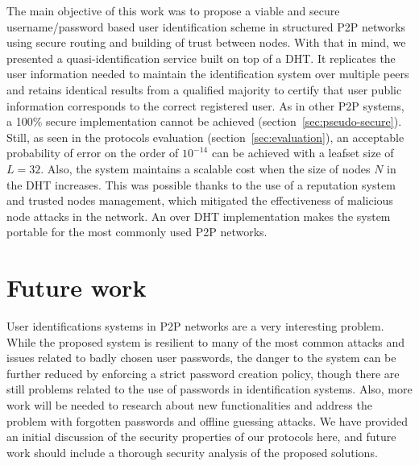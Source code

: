 The main objective of this work was to propose a viable and secure
username/password based user identification scheme in structured P2P
networks using secure routing and building of trust between nodes.
With that in mind, we presented a quasi-identification service built on top of a DHT. It
replicates the user information needed to maintain the identification system
over multiple peers and retains identical results from a qualified majority to
certify that user public information corresponds to the correct registered user.
As in other P2P
systems, a 100\% secure implementation cannot be achieved
(section~\ref{sec:pseudo-secure}). Still, as seen in the
protocols evaluation (section~\ref{sec:evaluation}), an acceptable probability of error on the order
of $10^{-14}$ can be achieved with a leafset size of $L = 32$. Also, the system
maintains a scalable cost when the size of nodes $N$ in the DHT increases.
This was possible thanks to the use of a reputation system and trusted
nodes management, which mitigated the effectiveness of malicious node attacks in
the network.
An over DHT implementation makes the system portable for the most commonly used P2P networks.\\




\section{Future work}


User identifications systems in P2P networks are a very interesting problem.
While the proposed system is resilient to many of the most common attacks
and issues related to badly chosen user passwords, the danger to the system can
be further reduced by enforcing a strict password creation policy, though there are still problems related to the use of
passwords in identification systems. 
Also, more work will be needed to research about new functionalities and address the
problem with forgotten passwords and offline guessing attacks.
We have provided an initial discussion of the security properties of our
protocols here, and future work should include a thorough security analysis of
the proposed solutions.

